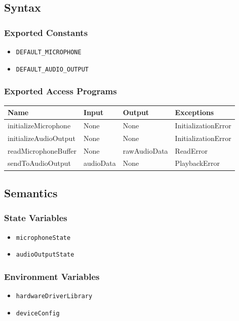 \documentclass[12pt, titlepage]{article}
\begin{document}
\subsection{Syntax}  

\subsubsection{Exported Constants}  
\begin{itemize}
    \item \texttt{DEFAULT\_MICROPHONE}  
    \item \texttt{DEFAULT\_AUDIO\_OUTPUT}  
\end{itemize}  

\subsubsection{Exported Access Programs}  
\begin{center}  
\begin{tabular}{|p{5cm}|p{2cm}|p{4cm}|p{3cm}|}  
\hline  
\textbf{Name} & \textbf{Input} & \textbf{Output} & \textbf{Exceptions} \\  
\hline  
initializeMicrophone & None & None & InitializationError \\  
initializeAudioOutput & None & None & InitializationError \\  
readMicrophoneBuffer & None & rawAudioData & ReadError \\  
sendToAudioOutput & audioData & None & PlaybackError \\  
\hline  
\end{tabular}  
\end{center}  

\subsection{Semantics}  

\subsubsection{State Variables}  
\begin{itemize}  
    \item \texttt{microphoneState}  
    \item \texttt{audioOutputState}  
\end{itemize}  

\subsubsection{Environment Variables}  
\begin{itemize}  
    \item \texttt{hardwareDriverLibrary}  
    \item \texttt{deviceConfig}  
\end{itemize}  
\end{document}
